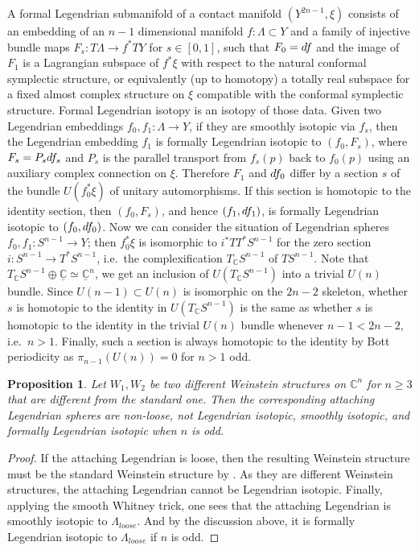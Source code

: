 \documentclass[reqno,11pt]{amsart}
\numberwithin{equation}{section}
\newtheorem{proposition}[theorem]{\textbf{Proposition}}
\def\C{{\mathbb C}}
\def\rd{{\rm d}}
\begin{document}
A formal Legendrian submanifold of a contact manifold $(Y^{2n-1},\xi)$ consists of an embedding of an $n-1$ dimensional manifold $f:\Lambda\subset Y$ and a family of injective bundle maps $F_s:T\Lambda \to  f^*TY $ for $s\in [0,1]$, such that $F_0=\rd f$ and the image of $F_1$ is a Lagrangian subspace of $f^*\xi$ with respect to the natural conformal symplectic structure, or equivalently (up to homotopy) a totally real subspace for a fixed almost complex structure on $\xi$ compatible with the conformal symplectic structure. Formal Legendrian isotopy is an isotopy of those data. Given two Legendrian embeddings $f_0,f_1:\Lambda \to Y$, if they are smoothly isotopic via $f_s$, then the Legendrian embedding $f_1$ is formally Legendrian isotopic to $(f_0,F_s)$, where $F_s = P_s\rd f_s$ and $P_s$ is the parallel transport from $f_s(p)$ back to $f_0(p)$ using an auxiliary complex connection on $\xi$. Therefore $F_1$ and $\rd f_0$ differ by a section $s$ of the bundle $U(f_0^*\xi)$ of unitary automorphisms. If this section is homotopic to the identity section, then $(f_0,F_s)$, and hence $(f_1,\rd f_1)$, is formally Legendrian isotopic to $(f_0,\rd f_0)$. Now we can consider the situation of Legendrian spheres $f_0,f_1:S^{n-1}\to Y$; then $f_0^*\xi$ is isomorphic to $i^*TT^*S^{n-1}$ for the zero section $i:S^{n-1}\to T^*S^{n-1}$, i.e.\ the complexification $T_{\C}S^{n-1}$ of $TS^{n-1}$. Note that $T_{\C}S^{n-1}\oplus \underline{\C}\simeq \underline{\C}^{n}$, we get an inclusion of $U(T_{\C}S^{n-1})$ into a trivial $U(n)$ bundle. Since $U(n-1)\subset U(n)$ is isomorphic on the $2n-2$ skeleton, whether $s$ is homotopic to the identity in $U(T_{\C}S^{n-1})$ is the same as whether $s$ is homotopic to the identity in the trivial $U(n)$ bundle whenever $n-1< 2n-2$, i.e.\ $n>1$. Finally, such a section is always homotopic to the identity by Bott periodicity as $\pi_{n-1}(U(n))=0$ for $n>1$ odd.

\begin{proposition}
    Let $W_1,W_2$ be two different Weinstein structures on $\C^n$ for $n\ge 3$ that are different from the standard one. Then the corresponding attaching Legendrian spheres are non-loose, not Legendrian isotopic, smoothly isotopic, and formally Legendrian isotopic when $n$ is odd.
\end{proposition}
\begin{proof}
    If the attaching Legendrian is loose, then the resulting Weinstein structure must be the standard Weinstein structure by \cite{zbMATH06054083}. As they are different Weinstein structures, the attaching Legendrian cannot be Legendrian isotopic. Finally, applying the smooth Whitney trick, one sees that the attaching Legendrian is smoothly isotopic to $\Lambda_{loose}$. And by the discussion above, it is formally Legendrian isotopic to $\Lambda_{loose}$ if $n$ is odd. 
\end{proof}
\end{document}
